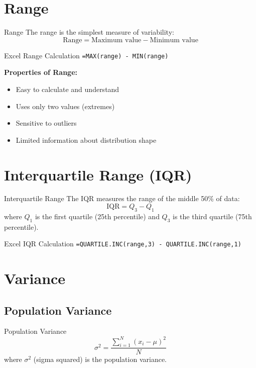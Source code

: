 \documentclass[12pt,a4paper]{book}
\begin{document}
\section{Range}

\begin{definition}{Range}
The range is the simplest measure of variability:
\[
\text{Range} = \text{Maximum value} - \text{Minimum value}
\]
\end{definition}

\begin{example}{Excel Range Calculation}
\texttt{=MAX(range) - MIN(range)}
\end{example}

\textbf{Properties of Range:}
\begin{itemize}
    \item Easy to calculate and understand
    \item Uses only two values (extremes)
    \item Sensitive to outliers
    \item Limited information about distribution shape
\end{itemize}

\section{Interquartile Range (IQR)}

\begin{definition}{Interquartile Range}
The IQR measures the range of the middle 50\% of data:
\[
\text{IQR} = Q_3 - Q_1
\]
where $Q_1$ is the first quartile (25th percentile) and $Q_3$ is the third quartile (75th percentile).
\end{definition}

\begin{example}{Excel IQR Calculation}
\texttt{=QUARTILE.INC(range,3) - QUARTILE.INC(range,1)}
\end{example}

\section{Variance}

\subsection{Population Variance}

\begin{definition}{Population Variance}
\[
\sigma^2 = \frac{\sum_{i=1}^{N} (x_i - \mu)^2}{N}
\]
where $\sigma^2$ (sigma squared) is the population variance.
\end{definition}
\end{document}
